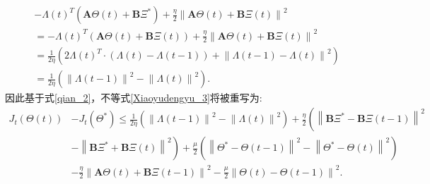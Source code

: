 \begin{equation}\label{qian_2}
    \begin{split}
        &- \boldsymbol \varLambda \left(t\right)^T \left( \boldsymbol A\boldsymbol{\varTheta}\left(t\right) 
        + \boldsymbol B\boldsymbol \varXi^*\right) + \frac{\eta}{2} \left\|\boldsymbol A\boldsymbol{\varTheta}\left(t\right) 
        + \boldsymbol B\boldsymbol \varXi\left(t\right)\right\|^2  \\
        &= -\boldsymbol \varLambda \left(t\right)^T \left( \boldsymbol A\boldsymbol{\varTheta}\left(t\right) 
        + \boldsymbol B\boldsymbol \varXi\left(t\right)\right) + \frac{\eta}{2} \left\|\boldsymbol A\boldsymbol{\varTheta}\left(t\right) 
        + \boldsymbol B\boldsymbol \varXi\left(t\right)\right\|^2 \\
        &= \frac{1}{2\eta} \left(2 \boldsymbol \varLambda \left(t\right)^T \cdot \left(\boldsymbol \varLambda \left(t\right) 
        - \boldsymbol \varLambda \left(t-1\right) \right)
        + \left\| \boldsymbol \varLambda \left(t-1\right) - \boldsymbol \varLambda \left(t\right)\right\|^2 \right) \\
        &= \frac{1}{2\eta} \left( \left\| \boldsymbol \varLambda \left(t-1\right)\right\|^2 
        - \left\| \boldsymbol \varLambda \left(t\right)\right\|^2 \right).
    \end{split}
\end{equation}
因此基于式\eqref{qian_2}，不等式\eqref{Xiaoyudengyu_3}将被重写为:
\begin{equation}
    \label{Xiaoyudengyu_4}
    \begin{split}
        J_t\left(\boldsymbol{\varTheta} \left(t\right)\right) &- J_t\left(\boldsymbol{\varTheta}^{*} \right) 
        \leq \frac{1}{2\eta} \left( \left\| \boldsymbol \varLambda \left(t-1\right)\right\|^2 
        - \left\| \boldsymbol \varLambda \left(t\right)\right\|^2 \right)  
        + \frac{\eta}{2} \left( \left\|\boldsymbol B\boldsymbol \varXi^* - \boldsymbol B\boldsymbol \varXi\left(t-1\right)\right\|^2 \right.\\
        & \left. - \left\|\boldsymbol B\boldsymbol \varXi^* + \boldsymbol B\boldsymbol \varXi\left(t\right)\right\|^2   \right) 
        + \frac{\mu}{2} \left( \left\| \boldsymbol\varTheta^* - \boldsymbol\varTheta\left(t-1\right)\right\|^2 
        - \left\| \boldsymbol\varTheta^* - \boldsymbol\varTheta\left(t\right)\right\|^2\right) \\
        &- \frac{\eta}{2} \left\|\boldsymbol A\boldsymbol{\varTheta}\left(t\right) + \boldsymbol B\boldsymbol \varXi\left(t-1\right)\right\|^2 
        - \frac{\mu}{2} \left\| \boldsymbol\varTheta\left(t\right) - \boldsymbol\varTheta\left(t-1\right)\right\|^2.
    \end{split}
\end{equation}
